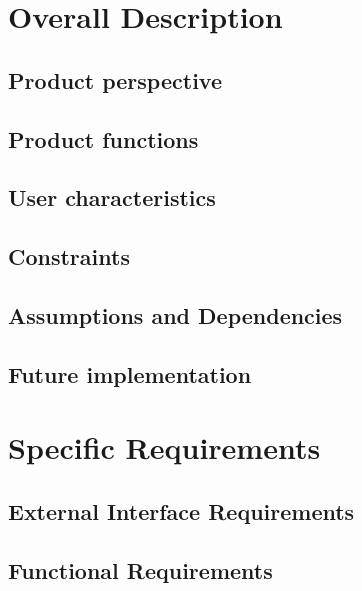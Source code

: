 \documentclass[]{report}
\begin{document}
\chapter{Overall Description}

\section{Product perspective}


\section{Product functions}


\section{User characteristics}


\section{Constraints}


\section{Assumptions and Dependencies}


\section{Future implementation}


\chapter{Specific Requirements}

\section{External Interface Requirements}


\section{Functional Requirements}

\end{document}
